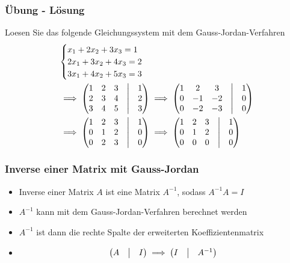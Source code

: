 \begin{frame}
    \frametitle{Übung - Lösung}
    Loesen Sie das folgende Gleichungssystem mit dem Gauss-Jordan-Verfahren
    \begin{align*}
        &\begin{cases}
             x_1 + 2x_2 + 3x_3 = 1 \\
             2x_1 + 3x_2 + 4x_3 = 2 \\
             3x_1 + 4x_2 + 5x_3 = 3
        \end{cases} \\
        &\implies
        \begin{pmatrix}
            1 & 2 & 3 & \bigm| & 1 \\
            2 & 3 & 4 & \bigm| & 2 \\
            3 & 4 & 5 & \bigm| & 3
        \end{pmatrix}
        \implies
        \begin{pmatrix}
            1 & 2  & 3  & \bigm| & 1 \\
            0 & -1 & -2 & \bigm| & 0 \\
            0 & -2 & -3 & \bigm| & 0
        \end{pmatrix} \\
        &\implies
        \begin{pmatrix}
            1 & 2 & 3 & \bigm| & 1 \\
            0 & 1 & 2 & \bigm| & 0 \\
            0 & 2 & 3 & \bigm| & 0
        \end{pmatrix}
        \implies
        \begin{pmatrix}
            1 & 2 & 3 & \bigm| & 1 \\
            0 & 1 & 2 & \bigm| & 0 \\
            0 & 0 & 0 & \bigm| & 0
        \end{pmatrix}
    \end{align*}
\end{frame}

\begin{frame}
    \frametitle{Inverse einer Matrix mit Gauss-Jordan}
    \begin{itemize}
        \item Inverse einer Matrix $A$ ist eine Matrix $A^{-1}$, sodass $A^{-1}A = I$
        \item $A^{-1}$ kann mit dem Gauss-Jordan-Verfahren berechnet werden
        \item $A^{-1}$ ist dann die rechte Spalte der erweiterten Koeffizientenmatrix
        \item
        \begin{equation*}
            \begin{pmatrix}
                A & \bigm| & I
            \end{pmatrix}
            \implies
            \begin{pmatrix}
                I & \bigm| & A^{-1}
            \end{pmatrix}
        \end{equation*}
    \end{itemize}
\end{frame}

